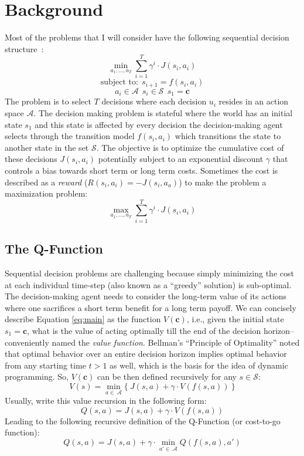 \setcounter{secnumdepth}{0}
\section{Background}
Most of the problems that I will consider have the following sequential decision structure~\cite{bertsekas1995dynamic}:
\begin{equation}
\min_{a_1,...,a_T} \sum_{i=1}^T \gamma^i \cdot J(s_i, a_i) 
\label{eq:main}
\end{equation}
\[
\text{subject to:} ~~ s_{i+1} = f(s_i, a_i)
\]
\[
a_i \in \mathcal{A} ~~ s_i \in \mathcal{S} ~~ s_1 = \mathbf{c}
\]
The problem is to select $T$ decisions where each decision $u_i$ resides in an action space $\mathcal{A}$. The decision making problem is stateful where the world has an initial state $s_1$ and this state is affected by every decision the decision-making agent selects through the transition model $f(s_i, a_i)$ which transitions the state to another state in the set $\mathcal{S}$. The objective is to optimize the cumulative cost of these decisions $J(s_i,a_i)$ potentially subject to an exponential discount $\gamma$ that controls a bias towards short term or long term costs. Sometimes the cost is described as a \emph{reward} ($R(s_i,a_i) = - J(s_i,a_a)$) to make the problem a maximization problem:
\[
\max_{a_1,...,a_T} \sum_{i=1}^T \gamma^i \cdot J(s_i, a_i) 
\]

\subsection*{The Q-Function}
Sequential decision problems are challenging because simply minimizing the cost at each individual time-step (also known as a ``greedy'' solution) is sub-optimal. The decision-making agent needs to consider the long-term value of its actions where one sacrifices a short term benefit for a long term payoff.
We can concisely describe Equation \ref{eq:main} as the function $V(\mathbf{c})$, i.e., given the initial state $s_1 = \mathbf{c}$, what is the value of acting optimally till the end of the decision horizon--conveniently named the \emph{value function}. Bellman's ``Principle of Optimality'' noted that optimal behavior over an entire decision horizon implies optimal behavior from any starting time $t>1$ as well, which is the basis for the idea of dynamic programming.
So, $V(\mathbf{c})$ can be then defined recursively for any $s \in \mathcal{S}$:
\begin{equation}
V(s) = \min_{a \in ~ \mathcal{A} }\{~J(s, a) + \gamma \cdot V( f(s,a) ) ~\}
\label{eq:value}
\end{equation}
Usually, write this value recursion in the following form:
\[
Q(s,a) = J(s, a) + \gamma \cdot V( f(s,a) )
\]
Leading to the following recursive definition of the Q-Function (or cost-to-go function):
\begin{equation}
Q(s,a) = J(s, a) + \gamma \cdot \min_{a' \in ~ \mathcal{A} } Q( f(s,a) ,a')
\label{eq:q}
\end{equation}

